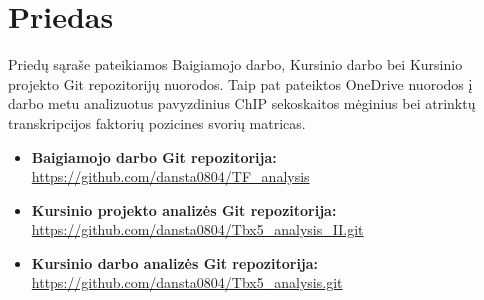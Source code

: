 \documentclass[12pt]{article}
\begin{document}

\section{Priedas} \label{Priedas}
Priedų sąraše pateikiamos Baigiamojo darbo, Kursinio darbo bei Kursinio projekto
Git repozitorijų nuorodos. Taip pat pateiktos OneDrive nuorodos į
darbo metu analizuotus pavyzdinius ChIP sekoskaitos mėginius bei atrinktų
transkripcijos faktorių pozicines svorių matricas.

\begin{itemize}
    \item \textbf{Baigiamojo darbo Git repozitorija:}\\
        \url{https://github.com/dansta0804/TF\_analysis}
    \item \textbf{Kursinio projekto analizės Git repozitorija:}\\
        \url{https://github.com/dansta0804/Tbx5\_analysis\_II.git}
    \item \textbf{Kursinio darbo analizės Git repozitorija:}\\
        \url{https://github.com/dansta0804/Tbx5\_analysis.git}
\end{itemize}
\end{document}
